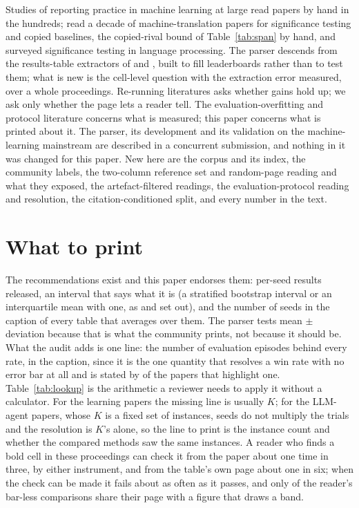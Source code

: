 \documentclass[sigconf,anonymous]{aamas}
\begin{document}
Studies of reporting practice in machine learning at large
\cite{dodge2019show,bouthillier2021accounting,christodoulou2025false,hutchinson2022evaluation}
read papers by hand in the hundreds; \citet{marie2021scientific} read a
decade of machine-translation papers for significance testing and copied
baselines, the copied-rival bound of Table~\ref{tab:span} by hand, and
\citet{dror2018hitchhiker} surveyed significance testing in language
processing. The parser descends from the results-table extractors of
\citet{hou2019identification} and \citet{kardas2020axcell}, built to fill
leaderboards rather than to test them; what is new is the cell-level
question with the extraction error measured, over a whole proceedings.
Re-running literatures
\cite{henderson2017deep,musgrave2020metric,dacrema2019really} asks whether
gains hold up; we ask only whether the page lets a reader tell. The
evaluation-overfitting and protocol literature
\cite{whiteson2011protecting,machado2018revisiting,balduzzi2018reevaluating}
concerns what is measured; this paper concerns what is printed about it. The
parser, its development and its validation on the machine-learning
mainstream are described in a concurrent submission, and nothing in it was
changed for this paper. New here are the corpus and its index, the community
labels, the two-column reference set and random-page reading and what they
exposed, the artefact-filtered readings, the evaluation-protocol reading and
resolution, the citation-conditioned split, and every number in the text.

\section{What to print}
\label{sec:conclusion}

The recommendations exist and this paper endorses them: per-seed results
released, an interval that says what it is (a stratified bootstrap
interval or an interquartile mean with one, as \citet{agarwal2021deep}
and \citet{gorsane2022towards} set out), and the number of seeds in the
caption of every table that averages over them.
The parser tests mean $\pm$ deviation because that is what the community
prints, not because it should be. What the audit adds is one line: the
number of evaluation episodes behind every rate, in the caption, since it
is the one quantity that resolves a win rate with no error bar at all and
is stated by \nPtwoRatePapersWithK{} of the \nPtwoRatePapers{} papers
that highlight one.
Table~\ref{tab:lookup} is the arithmetic a reviewer needs to apply it
without a calculator. For the learning papers the missing line is usually
$K$; for the LLM-agent papers, whose $K$ is a fixed set of instances,
seeds do not multiply the trials and the resolution is $K$'s alone, so
the line to print is the instance count and whether the compared methods
saw the same instances. A reader who finds a bold cell in these
proceedings can check it from the paper about one time in three, by
either instrument, and from the table's own page about one in six; when
the check can be made it fails about as often as it passes, and only
\nCzNeitherOnBandedPage{} of the reader's bar-less comparisons share
their page with a figure that draws a band.
\end{document}
